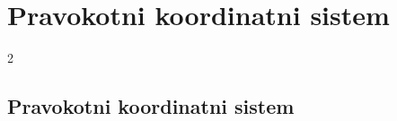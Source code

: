 \section{Pravokotni koordinatni sistem}

\begin{frame}
    \sectionpage
\end{frame}

\begin{frame}
    \begin{multicols}{2}
    \end{multicols}
\end{frame}


    \subsection{Pravokotni koordinatni sistem}

